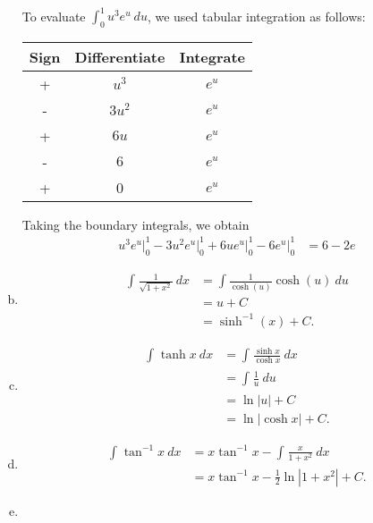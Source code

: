 \documentclass[10pt]{mypackage}
\begin{document}
\begin{enumerate}[(a)]
\begin{align*}
    \end{align*}
    To evaluate $\int_{0}^{1} u^{3}e^{u}\:du$, we used tabular integration as follows:
    \begin{center}
      \begin{tabular}{c|c|c}
        Sign & Differentiate & Integrate\\
        \hline
        + & $u^3$ & $e^u$\\
        - & $3u^2$ & $e^u$\\
        + & $6u$ & $e^u$\\
        - & $6$ & $e^u$\\
        + & 0 & $e^u$
      \end{tabular}
    \end{center}
      Taking the boundary integrals, we obtain
      \begin{align*}
          u^3e^u\bigr\vert_{0}^{1} - 3u^2e^u\bigr\vert_{0}^{1} + 6ue^u\bigr\vert_{0}^{1} - 6e^u\bigr\vert_{0}^{1} &= 6-2e
      \end{align*}
  \item 
    \begin{align*}
    \int_{}^{} \frac{1}{\sqrt{1+x^2}}\:dx &= \int\frac{1}{\cosh(u)}\cosh(u)\:du \tag*{$x = \sinh(u)$}\\
                                          &= u + C\\
                                          &= \sinh^{-1}\left(x\right) + C.
    \end{align*}
  \item 
    \begin{align*}
      \int_{}^{} \tanh x\:dx &= \int_{}^{} \frac{\sinh x}{\cosh x}\:dx\\
                             &= \int_{}^{} \frac{1}{u}\:du\tag*{$u = \cosh x$}\\
                             &= \ln\left\vert u \right\vert + C\\
                             &= \ln\left\vert \cosh x \right\vert + C.
    \end{align*}
  \item 
    \begin{align*}
      \int_{}^{} \tan^{-1}x\:dx &= x\tan^{-1}x - \int_{}^{} \frac{x}{1+x^2}\:dx\tag*{integration by parts}\\
                                &= x\tan^{-1}x - \frac{1}{2}\ln|1 + x^2| + C.\tag*{$u$-substitution implicit}
    \end{align*}
  \item 
    \begin{align*}

\end{align*}
\end{enumerate}
\end{document}
